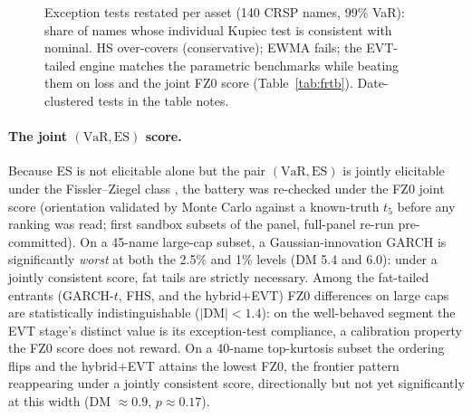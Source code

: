 \documentclass[11pt]{article}
\newcommand{\VaR}{\mathrm{VaR}}
\newcommand{\ES}{\mathrm{ES}}
\theoremstyle{remark}
\begin{document}
\begin{figure}[t]
\centering
{}
\caption{Exception tests restated per asset (140 CRSP names, 99\% VaR):
share of names whose individual Kupiec test is consistent with nominal.
HS over-covers (conservative); EWMA fails; the EVT-tailed engine matches
the parametric benchmarks while beating them on loss and the joint
FZ0 score
(Table~\ref{tab:frtb}). Date-clustered tests in the table notes.}
\label{fig:passrates}
\end{figure}

\paragraph{The joint $(\VaR,\ES)$ score.} Because ES is not elicitable
alone but the pair $(\VaR,\ES)$ is jointly elicitable under the
Fissler--Ziegel class \citep{fissler2016}, the battery was re-checked
under the FZ0 joint score (orientation validated by Monte Carlo against
a known-truth $t_5$ before any ranking was read; first sandbox subsets
of the panel, full-panel re-run pre-committed). On a
45-name large-cap subset, a Gaussian-innovation GARCH is significantly
\emph{worst} at both the 2.5\% and 1\% levels (DM 5.4 and 6.0): under a
jointly consistent score, fat tails are strictly necessary. Among the fat-tailed entrants (GARCH-$t$, FHS, and the hybrid$+$EVT) FZ0 differences on large caps are statistically indistinguishable
($|$DM$|<1.4$): on the well-behaved segment the EVT stage's distinct
value is its exception-test compliance, a calibration property the FZ0
score does not reward. On a 40-name top-kurtosis subset the ordering
flips and the hybrid$+$EVT attains the lowest FZ0, the frontier pattern reappearing under a jointly consistent score, directionally but not yet significantly at this width (DM $\approx 0.9$,
$p \approx 0.17$).
\end{document}
